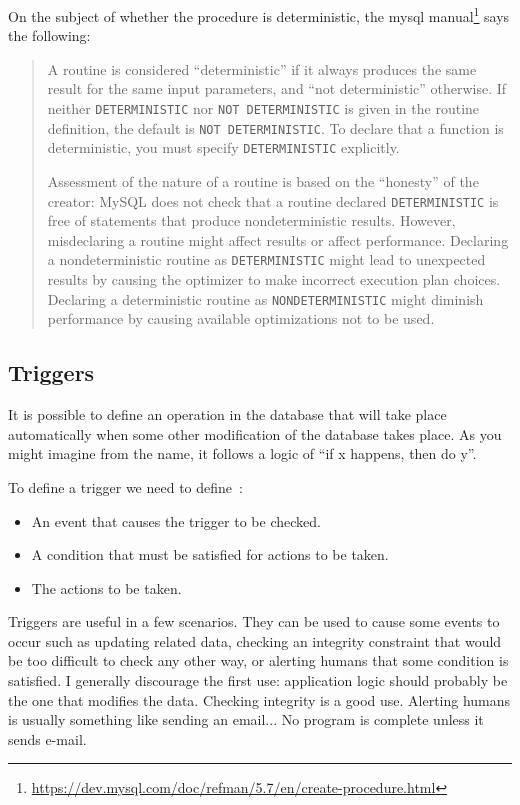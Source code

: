 On the subject of whether the procedure is deterministic, the mysql manual\footnote{\url{https://dev.mysql.com/doc/refman/5.7/en/create-procedure.html}} says the following:

\begin{quote}
A routine is considered ``deterministic'' if it always produces the same result for the same input parameters, and ``not deterministic'' otherwise. If neither \texttt{DETERMINISTIC} nor \texttt{NOT DETERMINISTIC} is given in the routine definition, the default is \texttt{NOT DETERMINISTIC}. To declare that a function is deterministic, you must specify \texttt{DETERMINISTIC} explicitly.

Assessment of the nature of a routine is based on the ``honesty'' of the creator: MySQL does not check that a routine declared \texttt{DETERMINISTIC} is free of statements that produce nondeterministic results. However, misdeclaring a routine might affect results or affect performance. Declaring a nondeterministic routine as \texttt{DETERMINISTIC} might lead to unexpected results by causing the optimizer to make incorrect execution plan choices. Declaring a deterministic routine as \texttt{NONDETERMINISTIC} might diminish performance by causing available optimizations not to be used.
\end{quote}



\subsection*{Triggers}

It is possible to define an operation in the database that will take place automatically when some other modification of the database takes place. As you might imagine from the name, it follows a logic of ``if x happens, then do y''. 

To define a trigger we need to define~\cite{dsc}:
\begin{itemize}
	\item An event that causes the trigger to be checked.
	\item A condition that must be satisfied for actions to be taken.
	\item The actions to be taken.
\end{itemize}

Triggers are useful in a few scenarios. They can be used to cause some events to occur such as updating related data, checking an integrity constraint that would be too difficult to check any other way, or alerting humans that some condition is satisfied. I generally discourage the first use: application logic should probably be the one that modifies the data. Checking integrity is a good use. Alerting humans is usually something like sending an email... No program is complete unless it sends e-mail.







